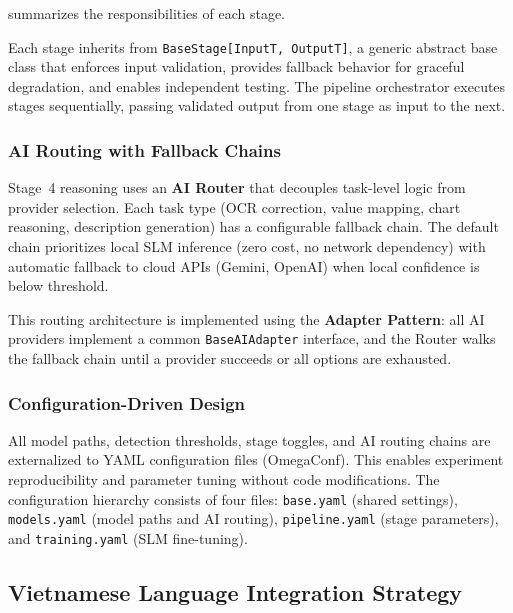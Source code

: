  summarizes the responsibilities of each stage.

\begin{table}[htbp]
\centering
\caption{Pipeline stages: input, output, and key technologies.}
\label{tab:stages}

\end{table}

Each stage inherits from \texttt{BaseStage[InputT,~OutputT]}, a generic abstract base
class that enforces input validation, provides fallback behavior for graceful degradation,
and enables independent testing. The pipeline orchestrator executes stages sequentially,
passing validated output from one stage as input to the next.

\subsubsection{AI Routing with Fallback Chains}

Stage~4 reasoning uses an \textbf{AI Router} that decouples task-level logic from
provider selection. Each task type (OCR correction, value mapping, chart reasoning,
description generation) has a configurable fallback chain. The default chain prioritizes
local SLM inference (zero cost, no network dependency) with automatic fallback to
cloud APIs (Gemini, OpenAI) when local confidence is below threshold.

This routing architecture is implemented using the \textbf{Adapter Pattern}: all AI
providers implement a common \texttt{BaseAIAdapter} interface, and the Router walks
the fallback chain until a provider succeeds or all options are exhausted.

\subsubsection{Configuration-Driven Design}

All model paths, detection thresholds, stage toggles, and AI routing chains are
externalized to YAML configuration files (OmegaConf). This enables experiment
reproducibility and parameter tuning without code modifications. The configuration
hierarchy consists of four files: \texttt{base.yaml} (shared settings),
\texttt{models.yaml} (model paths and AI routing), \texttt{pipeline.yaml}
(stage parameters), and \texttt{training.yaml} (SLM fine-tuning).

\subsection{Vietnamese Language Integration Strategy}
\label{sec:viet_loc}

